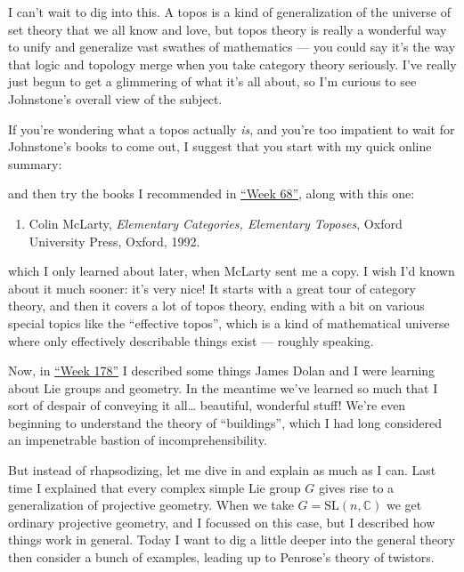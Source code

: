 \documentclass{article}
\def\tightlist{}
\renewcommand{\texttt}[1]{%
  \begingroup
  \ttfamily
  \begingroup\lccode`~=`/\lowercase{\endgroup\def~}{/\discretionary{}{}{}}%
  \begingroup\lccode`~=`[\lowercase{\endgroup\def~}{[\discretionary{}{}{}}%
  \begingroup\lccode`~=`.\lowercase{\endgroup\def~}{.\discretionary{}{}{}}%
  \catcode`/=\active\catcode`[=\active\catcode`.=\active
  \scantokens{#1\noexpand}%
  \endgroup
}
\begin{document}
I can't wait to dig into this. A topos is a kind of generalization of
the universe of set theory that we all know and love, but topos theory
is really a wonderful way to unify and generalize vast swathes of
mathematics --- you could say it's the way that logic and topology merge
when you take category theory seriously. I've really just begun to get a
glimmering of what it's all about, so I'm curious to see Johnstone's
overall view of the subject.

If you're wondering what a topos actually \emph{is}, and you're too
impatient to wait for Johnstone's books to come out, I suggest that you
start with my quick online summary:


and then try the books I recommended in
\protect\hyperlink{week68}{``Week 68''}, along with this one:

\begin{enumerate}
\def\labelenumi{\arabic{enumi})}
\setcounter{enumi}{3}
\tightlist
\item
  Colin McLarty, \emph{Elementary Categories, Elementary Toposes},
  Oxford University Press, Oxford, 1992.
\end{enumerate}

which I only learned about later, when McLarty sent me a copy. I wish
I'd known about it much sooner: it's very nice! It starts with a great
tour of category theory, and then it covers a lot of topos theory,
ending with a bit on various special topics like the ``effective
topos'', which is a kind of mathematical universe where only effectively
describable things exist --- roughly speaking.

Now, in \protect\hyperlink{week178}{``Week 178''} I described some
things James Dolan and I were learning about Lie groups and geometry. In
the meantime we've learned so much that I sort of despair of conveying
it all\ldots{} beautiful, wonderful stuff! We're even beginning to
understand the theory of ``buildings'', which I had long considered an
impenetrable bastion of incomprehensibility.

But instead of rhapsodizing, let me dive in and explain as much as I
can. Last time I explained that every complex simple Lie group \(G\)
gives rise to a generalization of projective geometry. When we take
\(G=\mathrm{SL}(n,\mathbb{C})\) we get ordinary projective geometry, and
I focussed on this case, but I described how things work in general.
Today I want to dig a little deeper into the general theory then
consider a bunch of examples, leading up to Penrose's theory of
twistors.
\end{document}

